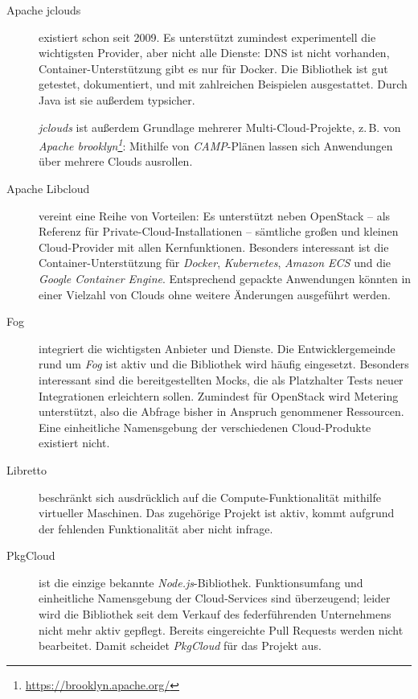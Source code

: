 \begin{description}
	
	\item[Apache jclouds] existiert schon seit 2009. Es unterstützt zumindest experimentell die wichtigsten Provider, aber nicht alle Dienste: DNS ist nicht vorhanden, Container-Unterstützung gibt es nur für Docker. Die Bibliothek ist gut getestet, dokumentiert, und mit zahlreichen Beispielen ausgestattet. Durch Java ist sie außerdem typsicher. 
	
	\emph{jclouds} ist außerdem Grundlage mehrerer Multi-Cloud-Projekte, z.\,B. von \emph{Apache brooklyn\footnote{\url{https://brooklyn.apache.org/}}}: Mithilfe von \emph{CAMP}-Plänen lassen sich Anwendungen über mehrere Clouds ausrollen.
	
	\item[Apache Libcloud] vereint eine Reihe von Vorteilen: Es unterstützt neben OpenStack -- als Referenz für Private-Cloud-Installationen -- sämtliche großen und kleinen Cloud-Provider mit allen Kernfunktionen. Besonders interessant ist die Container-Unterstützung für \emph{Docker}, \emph{Kubernetes}, \emph{Amazon ECS} und die \emph{Google Container Engine}. Entsprechend gepackte Anwendungen könnten in einer Vielzahl von Clouds ohne weitere Änderungen ausgeführt werden.
	
	\item[Fog] integriert die wichtigsten Anbieter und Dienste. Die Entwicklergemeinde rund um \emph{Fog} ist aktiv und die Bibliothek wird häufig eingesetzt. Besonders interessant sind die bereitgestellten Mocks, die als Platzhalter Tests neuer Integrationen erleichtern sollen. Zumindest für OpenStack wird Metering unterstützt, also die Abfrage bisher in Anspruch genommener Ressourcen. Eine einheitliche Namensgebung der verschiedenen Cloud-Produkte existiert nicht.
	
	\item[Libretto] beschränkt sich ausdrücklich auf die Compute-Funktionalität mithilfe virtueller Maschinen. Das zugehörige Projekt ist aktiv, kommt aufgrund der fehlenden Funktionalität aber nicht infrage.
	
	\item[PkgCloud] ist die einzige bekannte \emph{Node.js}-Bibliothek. Funktionsumfang und einheitliche Namensgebung der Cloud-Services sind überzeugend; leider wird die Bibliothek seit dem Verkauf des federführenden Unternehmens nicht mehr aktiv gepflegt. Bereits eingereichte Pull Requests werden nicht bearbeitet. Damit scheidet \emph{PkgCloud} für das Projekt aus.
	
\end{description}

